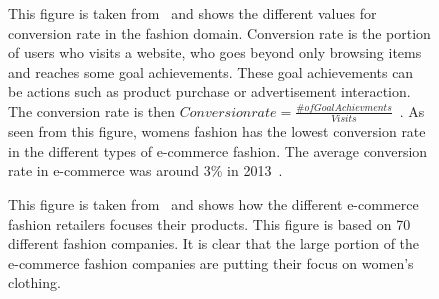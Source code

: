  \begin{figure}[H]
      \centering

      \caption[Conversion Rate in Fashion Retail]{This figure is taken from~\cite{Jorij2012} and shows the different values for conversion rate in the fashion domain.
      Conversion rate is the portion of users who visits a website, who goes beyond only browsing items and reaches some goal achievements.
      These goal achievements can be actions such as product purchase or advertisement interaction.
      The conversion rate is then $Conversion rate = \frac{\# of Goal Achievments}{Visits}$~\cite{nielsen2013}.
      As seen from this figure, womens fashion has the lowest conversion rate in the different types of e-commerce fashion.
      The average conversion rate in e-commerce was around 3\% in 2013~\cite{nielsen2013}.
      }
  \end{figure}

  \begin{figure}[H]
    \centering
    \caption[E-commerce benchmark and Fashion]{This figure is taken from~\cite{Jorij2012} and shows how the different e-commerce fashion retailers focuses their products.
    This figure is based on 70 different fashion companies.
    It is clear that the large portion of the e-commerce fashion companies are putting their focus on women's clothing.}
  \end{figure}

